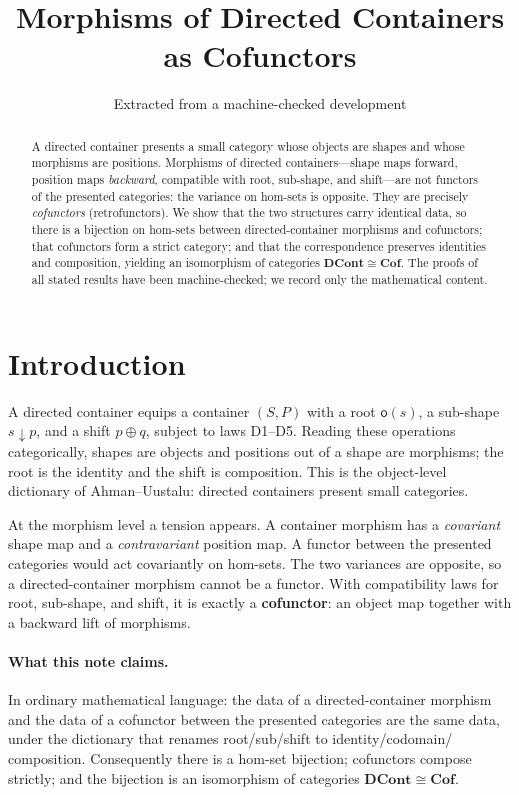 \documentclass[11pt,a4paper]{article}
\title{Morphisms of Directed Containers\\
  as Cofunctors}
\author{Extracted from a machine-checked development}
\date{}
\theoremstyle{plain}
\theoremstyle{definition}
\newcommand{\rootpos}{\mathsf{o}}
\newcommand{\sub}{\mathbin{\downarrow}}
\newcommand{\shift}{\oplus}
\newcommand{\DCont}{\mathbf{DCont}}
\newcommand{\Cof}{\mathbf{Cof}}
\begin{document}
\maketitle

\begin{abstract}
A directed container presents a small category whose objects are shapes and
whose morphisms are positions. Morphisms of directed containers---shape maps
forward, position maps \emph{backward}, compatible with root, sub-shape, and
shift---are not functors of the presented categories: the variance on
hom-sets is opposite. They are precisely \emph{cofunctors} (retrofunctors).
We show that the two structures carry identical data, so there is a bijection
on hom-sets between directed-container morphisms and cofunctors; that
cofunctors form a strict category; and that the correspondence preserves
identities and composition, yielding an isomorphism of categories
$\DCont\cong\Cof$. The proofs of all stated results have been machine-checked;
we record only the mathematical content.
\end{abstract}

\tableofcontents
\bigskip

\section{Introduction}

A directed container equips a container $(S,P)$ with a root $\rootpos(s)$, a
sub-shape $s\sub p$, and a shift $p\shift q$, subject to laws D1--D5. Reading
these operations categorically, shapes are objects and positions out of a
shape are morphisms; the root is the identity and the shift is composition.
This is the object-level dictionary of Ahman--Uustalu: directed containers
present small categories.

At the morphism level a tension appears. A container morphism has a
\emph{covariant} shape map and a \emph{contravariant} position map. A functor
between the presented categories would act covariantly on hom-sets. The two
variances are opposite, so a directed-container morphism cannot be a functor.
With compatibility laws for root, sub-shape, and shift, it is exactly a
\textbf{cofunctor}: an object map together with a backward lift of morphisms.

\paragraph{What this note claims.}
In ordinary mathematical language: the data of a directed-container morphism
and the data of a cofunctor between the presented categories are the same
data, under the dictionary that renames root/sub/shift to identity/codomain/
composition. Consequently there is a hom-set bijection; cofunctors compose
strictly; and the bijection is an isomorphism of categories
$\DCont\cong\Cof$.
\end{document}
